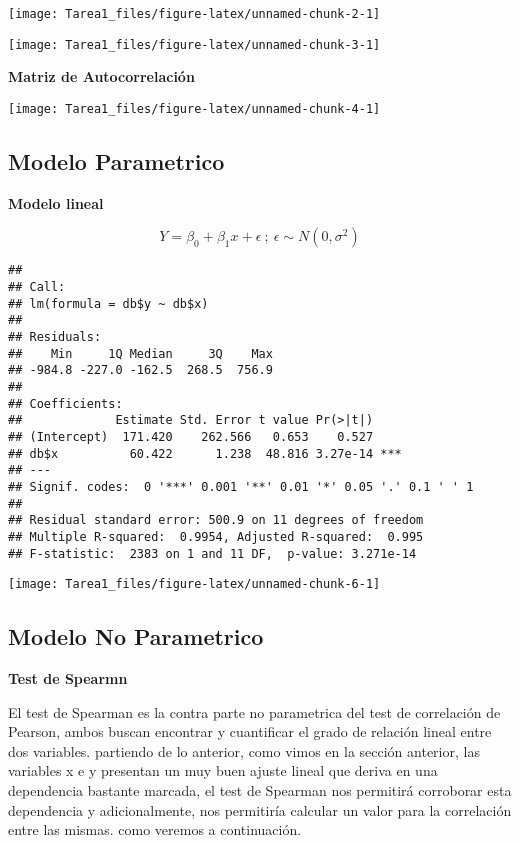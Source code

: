 \documentclass[
  12pt,
  letterpaper,
]{article}
\begin{document}
\begin{center}\texttt{[image: Tarea1\_files/figure-latex/unnamed-chunk-2-1]} \end{center}

\begin{center}\texttt{[image: Tarea1\_files/figure-latex/unnamed-chunk-3-1]} \end{center}

\textbf{Matriz de Autocorrelación}

\begin{center}\texttt{[image: Tarea1\_files/figure-latex/unnamed-chunk-4-1]} \end{center}

\subsection{Modelo Parametrico}

\textbf{Modelo lineal}

\[Y = \beta_0 + \beta_1x+\epsilon \: ; \: \epsilon \sim N(0, \sigma^2)\]

\begin{verbatim}
## 
## Call:
## lm(formula = db$y ~ db$x)
## 
## Residuals:
##    Min     1Q Median     3Q    Max 
## -984.8 -227.0 -162.5  268.5  756.9 
## 
## Coefficients:
##             Estimate Std. Error t value Pr(>|t|)    
## (Intercept)  171.420    262.566   0.653    0.527    
## db$x          60.422      1.238  48.816 3.27e-14 ***
## ---
## Signif. codes:  0 '***' 0.001 '**' 0.01 '*' 0.05 '.' 0.1 ' ' 1
## 
## Residual standard error: 500.9 on 11 degrees of freedom
## Multiple R-squared:  0.9954, Adjusted R-squared:  0.995 
## F-statistic:  2383 on 1 and 11 DF,  p-value: 3.271e-14
\end{verbatim}

\begin{center}\texttt{[image: Tarea1\_files/figure-latex/unnamed-chunk-6-1]} \end{center}

\subsection{Modelo No Parametrico}

\textbf{Test de Spearmn}

El test de Spearman es la contra parte no parametrica del test de
correlación de Pearson, ambos buscan encontrar y cuantificar el grado de
relación lineal entre dos variables. partiendo de lo anterior, como
vimos en la sección anterior, las variables x e y presentan un muy buen
ajuste lineal que deriva en una dependencia bastante marcada, el test de
Spearman nos permitirá corroborar esta dependencia y adicionalmente, nos
permitiría calcular un valor para la correlación entre las mismas. como
veremos a continuación.
\end{document}
